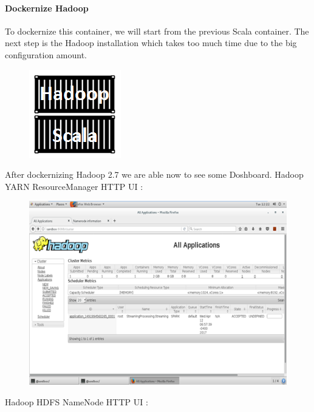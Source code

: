 \paragraph{Dockernize Hadoop}
\label{sec:sec01}
To dockernize this container, we will start from the previous Scala container. 
The next step is the Hadoop installation which takes too much time due to the big configuration amount.
\begin{figure}[h!]
	\centering
	\includegraphics[height=0.2\textheight]{fig01/HadoopContainer}
	\label{fig:FilialesEtClients}
\end{figure}
\newpage
After dockernizing Hadoop 2.7 we are able now to see some Doshboard.
Hadoop YARN ResourceManager HTTP UI :
\begin{figure}[h!]
	\centering
	\includegraphics[height=0.5	\textheight]{fig01/HadoopYarnDashboard}
	\label{fig:FilialesEtClients}
\end{figure}
\newpage
Hadoop HDFS NameNode HTTP UI :\\
